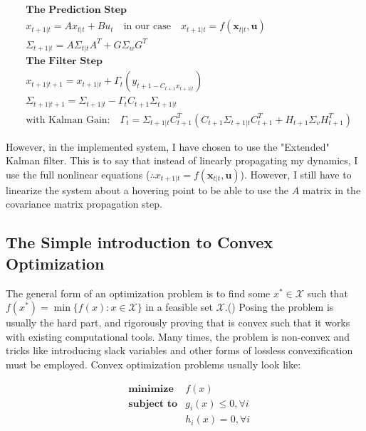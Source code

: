 \documentclass[conf]{new-aiaa}
\begin{document}
\begin{doublespace}
\begin{singlespace}
\begin{align}
& \textbf{The Prediction Step}\\
&x_{t+1|t} = Ax_{t|t} + Bu_t \quad \text{in our case} \quad x_{t+1|t} = f(\mathbf{x}_{t|t},\mathbf{u}) \\ 
&\Sigma_{t+1|t} = A\Sigma_{t|t}A^T + G\Sigma_w G^T \\
& \textbf{The Filter Step}\\
&x_{t+1|t+1} = x_{t+1|t} + \Gamma_t (y_{t+1 - C_{t+1}x_{t+1|t}}) \\
&\Sigma_{t+1|t+1} = \Sigma_{t+1|t} - \Gamma_t C_{t+1}\Sigma_{t+1|t} \\ 
& \text{with Kalman Gain:}\quad \Gamma_t= \Sigma_{t+1|t}C_{t+1}^T(C_{t+1}\Sigma_{t+1|t} C_{t+1}^T + H_{t+1}\Sigma_vH_{t+1}^T)
\label{kalman} 
\end{align}
\end{singlespace}

However, in the implemented system, I have chosen to use the "Extended" Kalman filter. This is to say that instead of linearly propagating my dynamics, I use the full nonlinear equations ($\therefore x_{t+1|t} = f(\mathbf{x}_{t|t},\mathbf{u})$). However, I still have to linearize the system about a hovering point to be able to use the $A$ matrix in the covariance matrix propagation step.

\subsection{The Simple introduction to Convex Optimization}
The general form of an optimization problem is to find some $\displaystyle x^\ast \in \mathcal{X}$ such that $\displaystyle f(x^{\ast })=\min\{f(x):x\in {\mathcal {X}}\}$ in a feasible set $\mathcal{X}$.(\citep{boyd}) Posing the problem is usually the hard part, and rigorously proving that is convex such that it works with existing computational tools. Many times, the problem is non-convex and tricks like introducing slack variables and other forms of lossless convexification must be employed. Convex optimization problems usually look like:

\begin{singlespace}
\begin{align*}
& \textbf{minimize} &f(x) \\ 
& \textbf{subject to} &g_i(x) \leq 0, \forall i \\
& & h_{i}(x)=0, \forall i
\end{align*}
\end{singlespace}


\end{doublespace}
\end{document}
